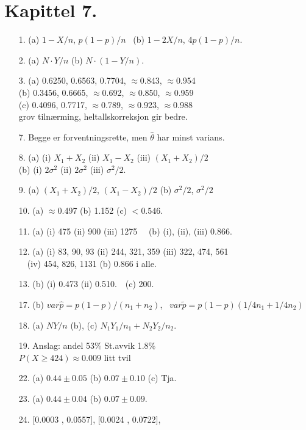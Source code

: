 \section*{Kapittel 7.}
\begin{itemize}         
\item[1.]  (a) $1-X/n$, $p(1-p)/n$  \ (b) $1-2X/n$, $4p(1-p)/n$.
\item[2.]  (a) $N\cdot Y/n$   (b) $N\cdot (1-Y/n)$.
\item[3.]  (a) 0.6250, 0.6563, 0.7704, $\approx$0.843, $\approx$0.954\\
              (b) 0.3456, 0.6665, $\approx$0.692, $\approx$0.850, $\approx$0.959\\
              (c) 0.4096, 0.7717, $\approx$0.789, $\approx$0.923, 
              $\approx$0.988 \\ grov tilnærming, heltallskorreksjon gir bedre.
\item[7.]  Begge er forventningsrette, men $\hat{\theta}$ har minst varians.
\item[8.]  (a) (i) $X_1 + X_2$  (ii) $X_1 -X_2$   (iii) $(X_1 + X_2 )/2$\\
              (b) (i) $2{\sigma}^2$ (ii) $2{\sigma}^2$  (iii) ${\sigma}^2 /2$.
\item[9.]  (a) $(X_1+X_2)/2$,   $(X_1-X_2)/2$   
           (b) ${\sigma}^2 /2$, ${\sigma}^2 /2$
\item[10.]  (a) $\approx$0.497   (b) 1.152   (c) $< 0.546$.
\item[11.]  (a) (i) 475   (ii) 900   (iii) 1275  \ \ (b) (i), (ii), (iii) 0.866.
\item[12.]  (a) (i) 83, 90, 93   (ii) 244, 321, 359  (iii) 322, 474, 561\\
            \ \  (iv) 454, 826, 1131   (b) 0.866 i alle.
\item[13.]  (b) (i) 0.473   (ii) 0.510.\ \ (c) 200.
\item[17.]  (b) $var\hat{p}=p(1-p)/(n_1+n_2)$, \
                $var\tilde{p}=p(1-p)(1/4n_1 +1/4n_2 )$
\item[18.]  (a) $NY/n$   (b), (c) $N_1Y_1/n_1+N_2Y_2/n_2.$
\item[19.] Anslag: andel 53\% St.avvik 1.8\% \\
           $P(X\geq 424)\approx 0.009$ litt tvil 
\item[22.]  (a) $0.44 \pm 0.05$   (b) $0.07 \pm 0.10$   (c) Tja.
\item[23.]  (a) $0.44 \pm 0.04$  (b) $0.07 \pm 0.09$.
\item[24.] [0.0003 , 0.0557], [0.0024 , 0.0722],

\end{itemize}
